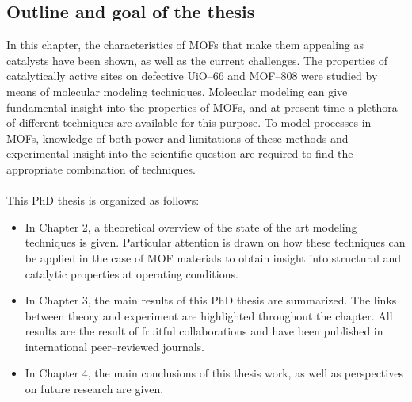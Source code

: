 \subsection*{Outline and goal of the thesis}
In this chapter, the characteristics of MOFs that make them appealing as catalysts have been shown, as well as the current challenges. The properties of catalytically active sites on defective UiO--66 and MOF--808 were studied by means of molecular modeling techniques. Molecular modeling can give fundamental insight into the properties of MOFs, and at present time a plethora of different techniques are available for this purpose. To model processes in MOFs, knowledge of both power and limitations of these methods and experimental insight into the scientific question are required to find the appropriate combination of techniques.\\\\
This PhD thesis is organized as follows:
\begin{itemize}
\item In Chapter 2, a theoretical overview of the state of the art modeling techniques is given. Particular attention is drawn on how these techniques can be applied in the case of MOF materials to obtain insight into structural and catalytic properties at operating conditions.
\item In Chapter 3, the main results of this PhD thesis are summarized. The links between theory and experiment are highlighted throughout the chapter. All results are the result of fruitful collaborations and have been published in international peer--reviewed journals. 
\item In Chapter 4, the main conclusions of this thesis work, as well as perspectives on future research are given.
\end{itemize}




